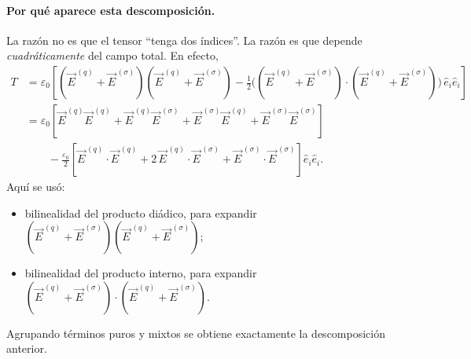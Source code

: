 \documentclass{article}
\numberwithin{equation}{section}
\newcommand{\Eself}{\vec E^{\,(q)}}
\newcommand{\Eext}{\vec E^{\,(\sigma)}}
\begin{document}
\paragraph{Por qué aparece esta descomposición.}
La razón no es que el tensor ``tenga dos índices''. La razón es que depende \emph{cuadráticamente} del campo total. En efecto,
\begin{align}
T
&=\varepsilon_0\left[(\Eself+\Eext)(\Eself+\Eext)-\frac12\big((\Eself+\Eext)\cdot(\Eself+\Eext)\big)\,\hat e_i\hat e_i\right] \\
&=\varepsilon_0\left[\Eself\Eself+\Eself\Eext+\Eext\Eself+\Eext\Eext\right] \\
&\qquad -\frac{\varepsilon_0}{2}\left[\Eself\cdot\Eself+2\,\Eself\cdot\Eext+\Eext\cdot\Eext\right]\hat e_i\hat e_i.
\end{align}
Aquí se usó:
\begin{itemize}[leftmargin=1.5em]
    \item bilinealidad del producto diádico, para expandir $(\Eself+\Eext)(\Eself+\Eext)$;
    \item bilinealidad del producto interno, para expandir $(\Eself+\Eext)\cdot(\Eself+\Eext)$.
\end{itemize}
Agrupando términos puros y mixtos se obtiene exactamente la descomposición anterior.
\end{document}
